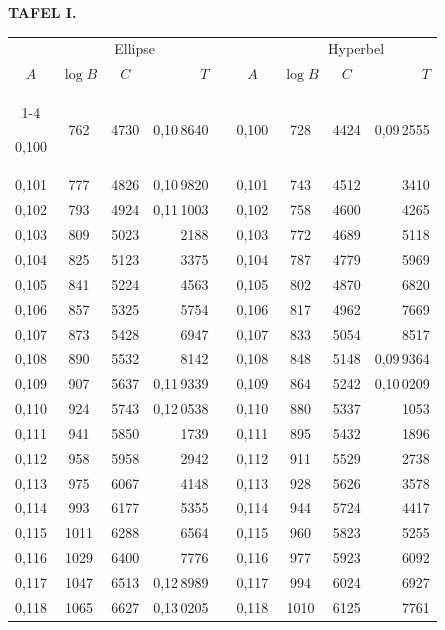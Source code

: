 \endgroup
\clearpage
{}
\begingroup
\centering
\fontsize{9}{9}\selectfont
\setlength{\tabcolsep}{6pt}
\renewcommand{\arraystretch}{1}
\setlength{\parskip}{0pt}
\textbf{TAFEL I.}
\par\vspace{7pt}
\begin{tabular}{|c|c|c|r|@{}p{9pt}@{}|c|c|c|r|}
\hline
\rule{0pt}{8.5pt} & \multicolumn{3}{c|}{Ellipse} & & & \multicolumn{3}{c|}{Hyperbel} \\
\(A\) & \(\log B\) & \(C\) & \(T\) & & \(A\) & \(\log B\) & \(C\) & \(T\) \\
\cline{1-4}\cline{6-9}
\rule{0pt}{8.5pt}0,100 & 762 & 4730 & 0,10\,8640 &  & 0,100 & 728 & 4424 & 0,09\,2555 \\
0,101 & 777 & 4826 & 0,10\,9820 &  & 0,101 & 743 & 4512 & 3410 \\
0,102 & 793 & 4924 & 0,11\,1003 &  & 0,102 & 758 & 4600 & 4265 \\
0,103 & 809 & 5023 & 2188 &  & 0,103 & 772 & 4689 & 5118 \\
0,104 & 825 & 5123 & 3375 &  & 0,104 & 787 & 4779 & 5969 \\
0,105 & 841 & 5224 & 4563 &  & 0,105 & 802 & 4870 & 6820 \\[3pt]
0,106 & 857 & 5325 & 5754 &  & 0,106 & 817 & 4962 & 7669 \\
0,107 & 873 & 5428 & 6947 &  & 0,107 & 833 & 5054 & 8517 \\
0,108 & 890 & 5532 & 8142 &  & 0,108 & 848 & 5148 & 0,09\,9364 \\
0,109 & 907 & 5637 & 0,11\,9339 &  & 0,109 & 864 & 5242 & 0,10\,0209 \\
0,110 & 924 & 5743 & 0,12\,0538 &  & 0,110 & 880 & 5337 & 1053 \\[3pt]
0,111 & 941 & 5850 & 1739 &  & 0,111 & 895 & 5432 & 1896 \\
0,112 & 958 & 5958 & 2942 &  & 0,112 & 911 & 5529 & 2738 \\
0,113 & 975 & 6067 & 4148 &  & 0,113 & 928 & 5626 & 3578 \\
0,114 & 993 & 6177 & 5355 &  & 0,114 & 944 & 5724 & 4417 \\
0,115 & 1011 & 6288 & 6564 &  & 0,115 & 960 & 5823 & 5255 \\[3pt]
0,116 & 1029 & 6400 & 7776 &  & 0,116 & 977 & 5923 & 6092 \\
0,117 & 1047 & 6513 & 0,12\,8989 &  & 0,117 & 994 & 6024 & 6927 \\
0,118 & 1065 & 6627 & 0,13\,0205 &  & 0,118 & 1010 & 6125 & 7761 \\

\end{tabular}

